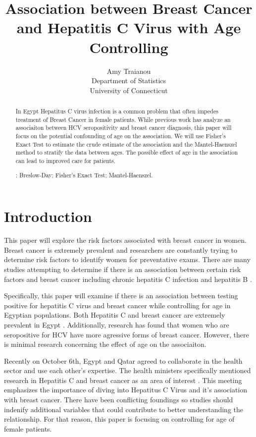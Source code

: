 \documentclass[12pt, titlepage]{article}
\title{Association between Breast Cancer and Hepatitis C Virus with Age Controlling}
\author{Amy Traianou\\
  Department of Statistics\\
  University of Connecticut
}
\begin{document}
\maketitle


\begin{abstract}
In Egypt Hepatitus C virus infection is a common problem that often impedes treatment
of Breast Cancer in female patients. While previous work has analyze an associaiton 
between HCV seropositivity and breast cancer diagnosis, this paper will focus on the 
potential confounding of age on the association. We will use Fisher's Exact Test to
estimate the crude estimate of the association and the Mantel-Haenszel method to 
stratify the data between ages. The possible effect of age in the association can
lead to improved care for patients. 


\bigskip
{}:
Breslow-Day;
Fisher's Exact Test;
Mantel-Haenszel.
\end{abstract}


\section{Introduction}
\label{sec:intro}

This paper will explore the risk factors associated with breast 
cancer in women. Breast cancer is extremely prevalent and researchers 
are constantly trying to determine risk factors to identify women for preventative exams.
There are many studies attempting to determine if there is an association 
between certain risk factors and breast cancer including chronic hepatitis 
C infection \citep{Larrey2010is} and hepatitis B \citep{vishnu2016does}. 

Specifically, this paper will examine if there is an association between 
testing positive for hepatitis C virus and breast cancer while controlling 
for age in Egyptian populations. Both Hepatitis C and breast 
cancer are extremely prevalent in Egypt \citep{Hussein2021high}.
Additionally, research has found that women who are seropositive for 
HCV have more agressive forms of breast cancer. However, there is 
minimal research concerning the effect of age on the associaiton. 

Recently on October 6th, Egypt and Qatar agreed to collaborate in the health sector and use each 
other's expertise. The health ministers specifically mentioned research 
in Hepatitis C and breast cancer as an area of interest \citep{arham2022egypt}. 
This meeting emphasizes the importance of diving into Hepatitus C Virus 
and it's association with breast cancer. There have been conflicting
foundings so studies should indenify additional variables that could 
contribute to better understanding the relationship. For that reason,
this paper is focusing on controlling for age of female patients. 
\end{document}
